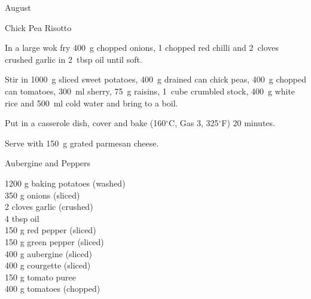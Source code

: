 \begin{menu}{August}
\begin{recipe}{2}{Chick Pea Risotto}
\begin{ingredients}
		\end{ingredients}
	
	
    \begin{instructions}
    \item 
        In a large wok fry
        400~g chopped onions,
        1 chopped red chilli
        and
        2~cloves crushed garlic
        in
        2~tbsp  oil
        until soft.
      \item 
        Stir in
        1000~g sliced sweet potatoes,
        400~g drained can chick peas,
        400~g chopped can tomatoes,
        300~ml  sherry,
        75~g  raisins,
        1~cube crumbled stock,
        400~g  white rice
        and
        500~ml  cold water
        and bring to a boil.
      \item 
        Put in a
        casserole dish,
        cover and bake (160$^{\circ}$C, Gas 3, 325$^{\circ}$F) 20 minutes.
      \item 
        Serve with
        150~g grated parmesan cheese.
      
    \end{instructions}
    \end{recipe}%
  
    \begin{recipe}{2}{Aubergine and Peppers}%
		\begin{ingredients}
		1200 g baking potatoes (washed) \\
	350 g onions (sliced) \\
	2 cloves garlic (crushed) \\
	4 tbsp oil  \\
	150 g red pepper (sliced) \\
	150 g green pepper (sliced) \\
	400 g aubergine (sliced) \\
	400 g courgette (sliced) \\
	150 g tomato puree  \\
	400 g tomatoes (chopped) \\
	
		\end{ingredients}
	
	

\end{recipe}
\end{menu}
